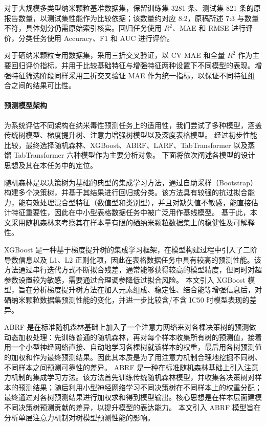 对于大规模多类型纳米颗粒基准数据集，保留训练集 3281 条、测试集 821 条的原报告数量，以测试集性能作为比较依据；该数量约对应 8:2，原稿所述 7:3 与数量不符，具体划分仍需原始索引核实。回归任务使用 $R^2$、MAE 和 RMSE 进行评价，分类任务使用 Accuracy、F1 和 AUC 进行评价。

对于硒纳米颗粒专用数据集，采用三折交叉验证，以 CV MAE 和全量 $R^2$ 作为主要回归评价指标，并用于比较基础特征与增强特征两种设置下不同模型的表现。增强特征筛选阶段同样采用三折交叉验证 MAE 作为统一指标，以保证不同特征组合之间的结果可比性。

\paragraph{预测模型架构}
为系统评估不同架构在纳米毒性预测任务上的适用性，我们尝试了多种模型，涵盖传统树模型、梯度提升树、注意力增强树模型以及深度表格模型。
经过初步性能比较，最终选择随机森林、XGBoost、ABRF、LARF、TabTransformer 以及蒸馏 TabTransformer 六种模型作为主要分析对象。
下面将依次阐述各模型的设计思想及其在本任务中的定位。

随机森林是以决策树为基础的典型的集成学习方法，通过自助采样（Bootstrap）构建多个决策树，并基于其结果进行回归或分类。该方法具有较强的抗过拟合能力，能有效处理混合型特征（数值型和类别型），并且对缺失值不敏感，能直接估计特征重要性，因此在中小型表格数据任务中被广泛用作基线模型。
基于此，本文采用随机森林来考察其在样本量有限的硒纳米颗粒数据集上的稳健性及可解释性。


XGBoost 是一种基于梯度提升树的集成学习框架，在模型构建过程中引入了二阶导数信息以及 L1、L2 正则化项，因此在表格数据任务中具有较高的预测性能。该方法通过串行迭代方式不断拟合残差，通常能够获得较高的模型精度，但同时对超参数设置较为敏感，需要通过合理调参降低过拟合风险。
本文引入 XGBoost 模型，旨在分析梯度提升树方法在加入元素组成、稳定性、结合能等增强信息后，对硒纳米颗粒数据集预测性能的变化，并进一步比较含/不含 IC50 时模型表现的差异。

ABRF 是在标准随机森林基础上加入了一个注意力网络来对各棵决策树的预测做动态加权处理：先训练普通的随机森林，再对每个样本收集所有树的预测值，接着用一个小型神经网络直接、自动地学习各棵树就该样本的权重，最后用各树预测值的加权和作为最终预测结果。因此其本质是为了用注意力机制合理地挖掘不同树、不同样本之间预测可靠性的差异。
ABRF 是一种在标准随机森林基础上引入注意力机制的集成学习方法。该方法首先训练传统随机森林模型，并收集各决策树对样本的预测结果；随后利用小型神经网络学习不同决策树在不同样本上的权重分配；最终通过对各树预测结果进行加权求和得到模型输出。核心思想是在样本层面建模不同决策树预测贡献的差异，以提升模型的表达能力。
本文引入 ABRF 模型旨在分析单层注意力机制对树模型预测性能的影响。



